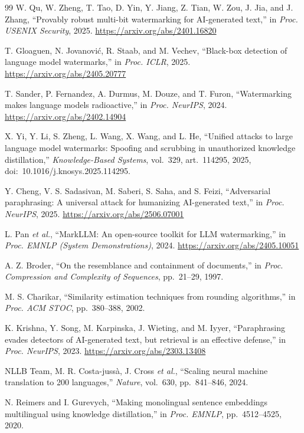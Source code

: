 \documentclass[journal]{IEEEtran}
\begin{document}
\begin{thebibliography}{99}
W. Qu, W. Zheng, T. Tao, D. Yin, Y. Jiang, Z. Tian, W. Zou, J. Jia, and J. Zhang, ``Provably robust multi-bit watermarking for AI-generated text,'' in \emph{Proc. USENIX Security}, 2025. \url{https://arxiv.org/abs/2401.16820}

T. Gloaguen, N. Jovanovi\'c, R. Staab, and M. Vechev, ``Black-box detection of language model watermarks,'' in \emph{Proc. ICLR}, 2025. \url{https://arxiv.org/abs/2405.20777}

T. Sander, P. Fernandez, A. Durmus, M. Douze, and T. Furon, ``Watermarking makes language models radioactive,'' in \emph{Proc. NeurIPS}, 2024. \url{https://arxiv.org/abs/2402.14904}

X. Yi, Y. Li, S. Zheng, L. Wang, X. Wang, and L. He, ``Unified attacks to large language model watermarks: Spoofing and scrubbing in unauthorized knowledge distillation,'' \emph{Knowledge-Based Systems}, vol.~329, art.~114295, 2025, doi:~10.1016/j.knosys.2025.114295.

Y. Cheng, V. S. Sadasivan, M. Saberi, S. Saha, and S. Feizi, ``Adversarial paraphrasing: A universal attack for humanizing AI-generated text,'' in \emph{Proc. NeurIPS}, 2025. \url{https://arxiv.org/abs/2506.07001}

L. Pan \emph{et al.}, ``MarkLLM: An open-source toolkit for LLM watermarking,'' in \emph{Proc. EMNLP (System Demonstrations)}, 2024. \url{https://arxiv.org/abs/2405.10051}

A. Z. Broder, ``On the resemblance and containment of documents,'' in \emph{Proc. Compression and Complexity of Sequences}, pp.~21--29, 1997.

M. S. Charikar, ``Similarity estimation techniques from rounding algorithms,'' in \emph{Proc. ACM STOC}, pp.~380--388, 2002.

K. Krishna, Y. Song, M. Karpinska, J. Wieting, and M. Iyyer, ``Paraphrasing evades detectors of AI-generated text, but retrieval is an effective defense,'' in \emph{Proc. NeurIPS}, 2023. \url{https://arxiv.org/abs/2303.13408}

NLLB Team, M. R. Costa-juss\`a, J. Cross \emph{et al.}, ``Scaling neural machine translation to 200 languages,'' \emph{Nature}, vol.~630, pp.~841--846, 2024.

N. Reimers and I. Gurevych, ``Making monolingual sentence embeddings multilingual using knowledge distillation,'' in \emph{Proc. EMNLP}, pp.~4512--4525, 2020.

\end{thebibliography}
\appendix
\end{document}
